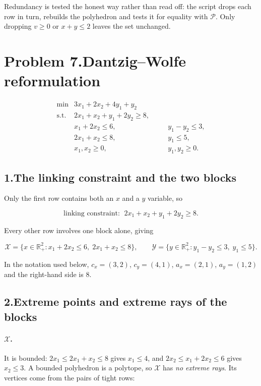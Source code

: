 \documentclass[11pt]{article}
\DeclareMathOperator*{\minimize}{min}
\theoremstyle{definition}
\theoremstyle{plain}
\begin{document}
Redundancy is tested the honest way rather than read off: the script
drops each row in turn, rebuilds the polyhedron and tests it for
equality with $\mathcal{P}$. Only dropping $v \ge 0$ or $x + y \le 2$
leaves the set unchanged.

\section*{Problem 7.\quad Dantzig--Wolfe reformulation \quad[15 pts]}

\[
\begin{array}{llll}
  \minimize & 3x_1 + 2x_2 + 4y_1 + y_2 & & \\
  \text{s.t.}
    & 2x_1 + x_2 + y_1 + 2y_2 \ge 8, & & \\
    & x_1 + 2x_2 \le 6, & \quad & y_1 - y_2 \le 3, \\
    & 2x_1 + x_2 \le 8, & & y_1 \le 5, \\
    & x_1, x_2 \ge 0, & & y_1, y_2 \ge 0 .
\end{array}
\]

\subsection*{1.\quad The linking constraint and the two blocks}

Only the first row contains both an $x$ and a $y$ variable, so

\[
  \boxed{\;\text{linking constraint: } \;
    2x_1 + x_2 + y_1 + 2y_2 \ge 8. \;}
\]

Every other row involves one block alone, giving

\[
  \mathcal{X} = \big\{ x \in \mathbb{R}^2_+ :
    x_1 + 2x_2 \le 6,\; 2x_1 + x_2 \le 8 \big\},
  \qquad
  \mathcal{Y} = \big\{ y \in \mathbb{R}^2_+ :
    y_1 - y_2 \le 3,\; y_1 \le 5 \big\}.
\]

In the notation used below, $c_x = (3,2)$, $c_y = (4,1)$,
$a_x = (2,1)$, $a_y = (1,2)$ and the right-hand side is $8$.

\subsection*{2.\quad Extreme points and extreme rays of the blocks}

\paragraph{$\mathcal{X}$.} It is bounded: $2x_1 \le 2x_1 + x_2 \le 8$
gives $x_1 \le 4$, and $2x_2 \le x_1 + 2x_2 \le 6$ gives $x_2 \le 3$.
A bounded polyhedron is a polytope, so $\mathcal{X}$ has \emph{no
extreme rays}. Its vertices come from the pairs of tight rows:
\end{document}
